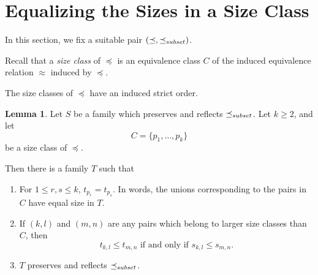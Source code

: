 \documentclass[12pt]{article}
\theoremstyle{definition}
\newtheorem{lemma}[theorem]{Lemma}
\newcommand{\set}[1]{\{ #1 \}}
\begin{document}
\section{Equalizing the Sizes in a Size Class}

In this section, we fix a suitable pair 
$(\preceq, \preceq_{\scriptsize subset})$.

Recall that a \emph{size class} of $\preceq$ is an equivalence class $C$
of the induced equivalence relation $\approx$ induced by $\preceq$.

The size classes of $\preceq$ have an induced strict order.

\begin{lemma}
Let $S$ be a family which preserves and reflects $\preceq_{\scriptsize subset}$.  Let $k\geq 2$, and let 
\[ C = \set{p_1, \ldots, p_k} \]
be a size class of  $\preceq$.
 
Then there is a family $T$ such that 
\begin{enumerate}
    \item 
 For $1\leq r,s \leq k$, $t_{p_r} = t_{p_s}$.
 In words, the  unions corresponding to the pairs in $C$ have equal size in $T$.   
    \item If $(k,l)$ and $(m,n)$ are any pairs 
    which belong to larger size classes than $C$,
    then 
    \[ \mbox{$t_{k,l} \leq t_{m,n} $ if and only if $s_{k,l} \leq s_{m,n} $}.\]
    \item $T$ preserves and reflects $\preceq_{\scriptsize subset}$. 
\label{equalize2}
\end{enumerate}
\label{lemma-equalize-subset}
\end{lemma}
\end{document}
